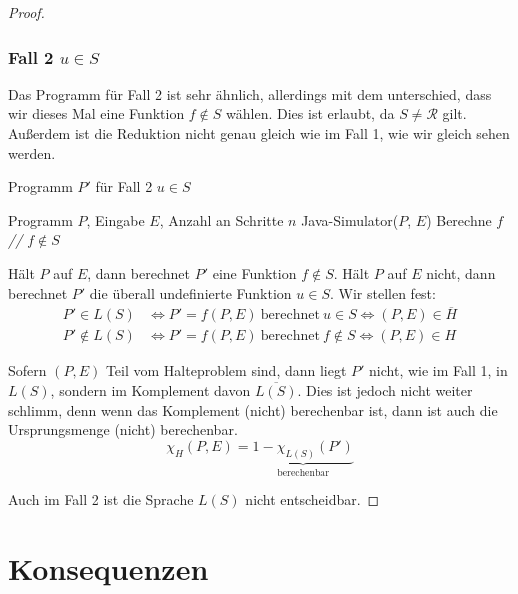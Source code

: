 \documentclass[journal]{IEEEtran}
\begin{document}
\begin{proof}
\subsubsection{Fall 2 $u \in S$}

Das Programm für Fall 2 ist sehr ähnlich, allerdings mit dem unterschied, dass wir dieses Mal eine Funktion $f \notin S$ wählen. Dies ist erlaubt, da $S \ne \mathcal{R}$ gilt. Außerdem ist die Reduktion nicht genau gleich wie im Fall 1, wie wir gleich sehen werden.

\begin{algorithm}
\caption{Programm $P'$ für Fall 2 $u \in S$}
\begin{algorithmic}[1]
\renewcommand{\algorithmicrequire}{\textbf{Input:}}
\renewcommand{\algorithmicensure}{\textbf{Output:}}
\REQUIRE Programm $P$, Eingabe $E$, Anzahl an Schritte $n$
\STATE Java-Simulator($P$, $E$)
\STATE Berechne $f$ \textit{// $f \notin S$}
\end{algorithmic}
\end{algorithm}

Hält $P$ auf $E$, dann berechnet $P'$ eine Funktion $f \notin S$. Hält $P$ auf $E$ nicht, dann berechnet $P'$ die überall undefinierte Funktion $u \in S$. Wir stellen fest:
\begin{align*}
P' \in L(S) &\Leftrightarrow P' = f(P, E) \ \text{berechnet} \ u \in S \Leftrightarrow (P, E) \in \overline{H} \\
P' \notin L(S) &\Leftrightarrow P' = f(P, E) \ \text{berechnet} \ f \notin S \Leftrightarrow (P, E) \in H
\end{align*}

Sofern $(P, E)$ Teil vom Halteproblem sind, dann liegt $P'$ nicht, wie im Fall 1, in $L(S)$, sondern im Komplement davon $\overline{L(S)}$. Dies ist jedoch nicht weiter schlimm, denn wenn das Komplement (nicht) berechenbar ist, dann ist auch die Ursprungsmenge (nicht) berechenbar.
\begin{equation*}
\chi_{H}(P, E) = \underbrace{1 - \chi_{L(S)}(P')}_{\text{berechenbar}}
\end{equation*}

Auch im Fall 2 ist die Sprache $L(S)$ nicht entscheidbar.

\end{proof}

\section{Konsequenzen}
\label{konsequenzen}
\end{document}
